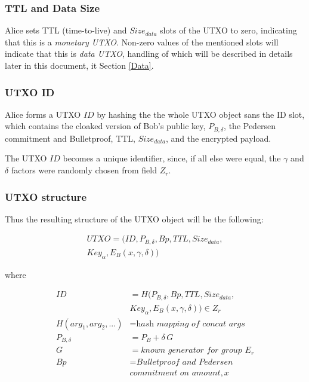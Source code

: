 \documentclass[8pt,fleqn,openany]{book}
\begin{document}
\subsubsection{TTL and Data Size} Alice sets TTL (time-to-live) and $Size_{data}$ slots of the UTXO to zero, indicating that this is a \textit{monetary UTXO}. Non-zero values of the mentioned slots will indicate that this is \textit{data UTXO}, handling of which will be described in details later in this document, it Section \ref{Data}.

\subsubsection{UTXO ID} Alice forms a UTXO $\mathit{ID}$ by hashing the the whole UTXO object sans the ID slot, which contains the cloaked version of Bob's public key, $P_{B, \delta}$, the Pedersen commitment and Bulletproof, TTL, $Size_{data}$, and the encrypted payload.

The UTXO $\mathit{ID}$ becomes a unique identifier, since, if all else were equal, the $\gamma$ and $\delta$ factors were randomly chosen from field $Z_r$.

\subsubsection{UTXO structure}

Thus the resulting structure of the UTXO object will be the following:

\begin{multline*}
UTXO = (ID, P_{B, \delta}, Bp, TTL, Size_{data},\\
        Key_{\alpha}, E_B(x, \gamma, \delta))
\end{multline*}

where

\begin{align*}
ID &= H(P_{B, \delta}, Bp, TTL, Size_{data}, \\ 
   & Key_{\alpha}, E_B(x, \gamma, \delta)) \in Z_r \\
H(arg_1, arg_2, ...) &= \textit{hash mapping of concat args} \\
P_{B, \delta} &= P_B + \delta \, G \\
G &= \textit{known generator for group } E_r \\
Bp &= \textit{Bulletproof and Pedersen} \\
& \textit{commitment on amount}, x 
\end{align*}
\end{document}
